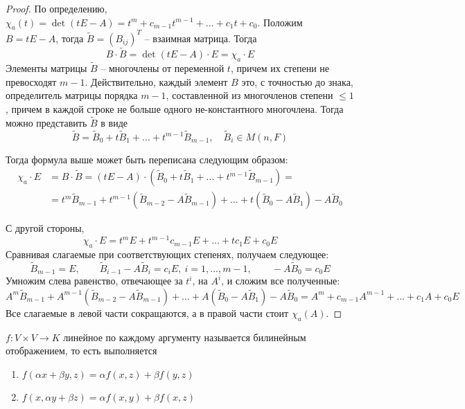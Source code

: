 \begin{proof}
	По определению, $\chi_a(t) = \det (tE-A) = t^m + c_{m - 1}t^{m - 1} + ... + c_1 t + c_0$. Положим $B = tE-A$, тогда $\widetilde{B} = (B_{ij})^T$ -- взаимная матрица.
	Тогда
	\[B \cdot \widetilde{B} = \det(tE - A) \cdot E = \chi_a \cdot E\]
	Элементы матрицы $\widetilde{B}$ -- многочлены от переменной $t$, причем их степени не превосходят $m - 1$.
	Действительно, каждый элемент $B$ это, с точностью до знака, определитель матрицы порядка $m - 1$, составленной из многочленов степени $\leqslant 1$, причем в каждой строке не больше одного не-константного многочлена.
	Тогда можно представить $\widetilde{B}$ в виде 
	\[\widetilde{B} = \widetilde{B}_0 + t\widetilde{B}_1 + ... + t^{m - 1}\widetilde{B}_{m - 1}, \quad \widetilde{B}_i \in M(n, F)\] 

	Тогда формула выше может быть переписана следующим образом:
	\begin{align*}
		\chi_a \cdot E &= B \cdot \widetilde{B} = (tE - A) \cdot (\widetilde{B}_0 + t\widetilde{B}_1 + ... + t^{m - 1}\widetilde{B}_{m - 1}) = \\
		&= t^m \widetilde{B}_{m - 1} + t^{m - 1}(\widetilde{B}_{m - 2} - A\widetilde{B}_{m - 1}) + ... + t(\widetilde{B}_0 - A\widetilde{B}_1) - A\widetilde{B}_0
	\end{align*}

	С другой стороны,
	\[\chi_a \cdot E = t^m E + t^{m - 1}c_{m - 1}E + ... + tc_1 E + c_0 E\]
	Сравнивая слагаемые при соответствующих степенях, получаем следующее:
	\[\widetilde{B}_{m - 1} = E, \qquad \widetilde{B}_{i - 1} - A\widetilde{B}_i = c_i E, \ i = 1, ..., m - 1, \qquad -A\widetilde{B}_0 = c_0 E\]
	Умножим слева равенство, отвечающее за $t^i$, на $A^i$, и сложим все полученные:
	\[A^m \widetilde{B}_{m - 1} + A^{m - 1}(\widetilde{B}_{m - 2} - A\widetilde{B}_{m - 1}) + ... + A(\widetilde{B}_0 - A\widetilde{B}_1) - A\widetilde{B}_0 = A^m  + c_{m - 1}A^{m - 1} + ... + c_1A + c_0 E\]
	Все слагаемые в левой части сокращаются, а в правой части стоит $\chi_a(A)$.  
\end{proof}

\begin{Def} 
	$f: V \times V \to K$ линейное по каждому аргументу называется билинейным отображением, то есть выполняется
	\begin{enumerate}
		\item $f(\alpha x + \beta y, z) = \alpha f(x,z) + \beta f(y,z)$
		\item $f(x, \alpha y + \beta z) = \alpha f(x, y) + \beta f(x, z)$
	\end{enumerate}
\end{Def} 

